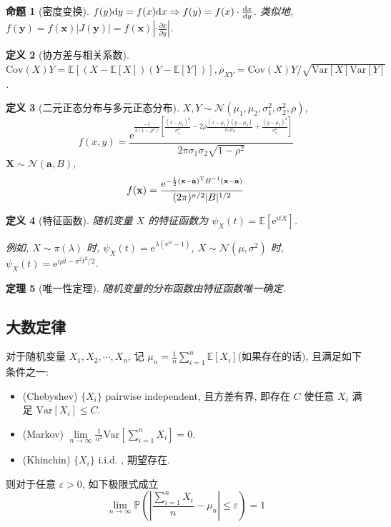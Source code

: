 \documentclass[8pt]{article}
\theoremstyle{compact}
\newtheorem{theorem}{定理}
\newtheorem{definition}[theorem]{定义}
\newtheorem{proposition}[theorem]{命题}
\def\le{\leqslant}
\def\P#1{\mathbb{P}\left({#1}\right)}
\def\e{\mathrm{e}}
\def\E#1{\mathbb{E}\left[{#1}\right]}
\def\Var#1{\text{Var}\left[{#1}\right]}
\def\Cov#1{\text{Cov}\left({#1}\right)}
\begin{document}
\begin{proposition}[密度变换]
	$f(y)\text dy = f(x)\text dx \Rightarrow f(y) = f(x) \cdot \frac{\text dx}{\text dy}$. 类似地, $f(\mathbf y) = f(\mathbf x)|J(\mathbf y)| = f(\mathbf x)|\cdot\frac{\partial x}{\partial y}|$.
\end{proposition}
\begin{definition}[协方差与相关系数]
	$\Cov{X}{Y} = \E{(X - \E{X})(Y - \E{Y})}, \rho_{XY} = \Cov{X}{Y} / \sqrt{\Var{X}\Var{Y}}$.
\end{definition}
\begin{definition}[二元正态分布与多元正态分布] $X, Y \sim \mathcal N(\mu_1, \mu_2, \sigma_1^2, \sigma_2^2, \rho)$, 
	$$f(x, y) = \frac{\e^{\frac{-1}{2(1-\rho^2)}\left[\frac{(x-\mu_1)^2}{\sigma_1^2} - 2\rho\frac{(x-\mu_1)(y-\mu_2)}{\sigma_1\sigma_2} + \frac{(y-\mu_2)^2}{\sigma_2^2}\right]}}{2\pi\sigma_1\sigma_2\sqrt{1-\rho^2}}$$
	$\mathbf X \sim \mathcal N(\mathbf a, B)$, $$f(\mathbf x) = \frac{\e^{-\frac12(\mathbf x - \mathbf a)^{\text T}B^{-1}(\mathbf x - \mathbf a)}}{(2\pi)^{n/2}|B|^{1/2}}$$
\end{definition}

\begin{definition}[特征函数]
	随机变量 $X$ 的特征函数为 $\psi_X(t) = \E{\e^{itX}}$.

	例如, $X \sim \pi(\lambda)$ 时, $\psi_X(t) = \e^{\lambda(\e^{it} - 1)}$, $X \sim \mathcal N(\mu, \sigma^2)$ 时, $\psi_X(t) = \e^{i\mu t - \sigma^2t^2/2}$.
\end{definition}

\begin{theorem}[唯一性定理]
	随机变量的分布函数由特征函数唯一确定.
\end{theorem}

\subsection{大数定律}
对于随机变量 $X_1, X_2, \cdots, X_n$, 记 $\mu_n = \frac1n\sum\limits_{i=1}^{n}\E{X_i}$(如果存在的话), 且满足如下条件之一:
\begin{itemize}
	\item (Chebyshev) $\{X_i\}$ pairwise independent, 且方差有界, 即存在 $C$ 使任意 $X_i$ 满足 $\Var{X_i} \le C$.
	\item (Markov) $\lim\limits_{n \to \infty}\frac{1}{n^2}\Var{\sum\limits_{i=1}^{n}X_i} = 0$.
	\item (Khinchin) $\{X_i\}$ i.i.d. , 期望存在.
\end{itemize}
则对于任意 $\varepsilon > 0$, 如下极限式成立 $$\lim_{n \to \infty}\P{\left|\frac{\sum_{i=1}^{n}X_i}{n} - \mu_n\right| \le \varepsilon} = 1$$
\end{document}
